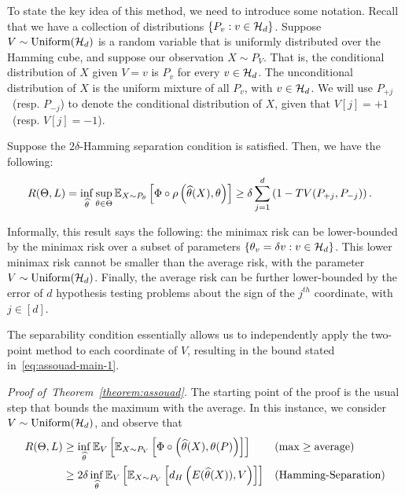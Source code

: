 \documentclass[12pt]{article}
\begin{document}
To state the key idea of this method, we need to introduce some notation. Recall that we have a collection of distributions $\{P_v: v \in {\cal H}_d\}$. Suppose $V \sim \mathrm{Uniform}({\cal H}_d)$ is a random variable that is uniformly distributed over the Hamming cube, and suppose our observation $X \sim P_V$. That is, the conditional distribution of $X$ given $V=v$ is $P_v$ for every $v \in {\cal H}_d$. The unconditional distribution of $X$ is the uniform mixture of all $P_v$, with $v \in {\cal H}_d$. We will use $P_{+j}$~(resp. $P_{-j}$) to denote the conditional distribution of $X$, given that $V[j] = +1$~(resp. $V[j]=-1$). 

\begin{theorem}
	\label{theorem:assouad}	Suppose the $2\delta$-Hamming separation condition is satisfied. Then, we have the following: 
	\begin{align}
		R(\Theta, L) &= \inf_{\widehat{\theta}} \sup_{\theta \in \Theta} \mathbb{E}_{X\sim P_\theta}\left[ \Phi \circ \rho \left( \widehat{\theta}(X), \theta\right) \right] 
		 \geq \delta \sum_{j=1}^d \left( 1 - TV(P_{+j},  P_{-j}) \right). \label{eq:assouad-main-1}
	\end{align}
\end{theorem}
\begin{remark}
	Informally, this result says the following: the minimax risk can be lower-bounded by the minimax risk over a subset of parameters $\{\theta_v = \delta v: v \in {\cal H}_d\}$. This lower minimax risk cannot be smaller than the average risk, with the parameter $V \sim \mathrm{Uniform}({\cal H}_d)$. Finally, the average risk can be further lower-bounded by the error of $d$ hypothesis testing problems about the sign of the $j^{th}$ coordinate, with $j \in [d]$. 

	The separability condition essentially allows us to independently apply the two-point method to each coordinate of $V$, resulting in the bound stated in~\eqref{eq:assouad-main-1}. 
\end{remark}
\emph{Proof of~Theorem~\ref{theorem:assouad}.} The starting point of the proof is the usual step that bounds the maximum with the average. In this instance, we consider $V \sim \mathrm{Uniform}({\cal H}_d)$, and observe that 
	\begin{align}
		R(\Theta, L) & \geq \inf_{\widehat{\theta}} \mathbb{E}_{V} \left[ \mathbb{E}_{X \sim P_V} \left[ \Phi \circ \left( \widehat{\theta}(X), \theta(P) \right)\right]\right] && (\max \geq \mathrm{average}) \\
		& \geq 2\delta \inf_{\widehat{\theta}} \mathbb{E}_{V}\left[ \mathbb{E}_{X \sim P_V} \left[ d_H\left( E(\widehat{\theta}(X)), V \right) \right] \right] && (\mathrm{Hamming\text{-}Separation}) \\
	\end{align}
\end{document}

